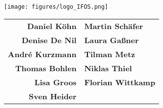 \begin{center}
\texttt{[image: figures/logo\_IFOS.png]}

\vspace{0.1\textwidth}

\begin{tabular}{rl}
\textbf{Daniel K\"ohn} & \textbf{Martin Sch\"afer}\\
\textbf{Denise De Nil} & \textbf{Laura Ga\ss ner}\\
\textbf{Andr\'{e} Kurzmann} & \textbf{Tilman Metz}\\
\textbf{Thomas Bohlen} & \textbf{Niklas Thiel}\\
\textbf{Lisa Groos} & \textbf{Florian Wittkamp}\\
\textbf{Sven Heider} & \\
\end{tabular}

% 
% 
% 
% 
% 
% 
% 
% 
% 
% 
% 
% 
% 
% 

\vspace{.15\textwidth}


% 
% 
\end{center}
\rmfamily